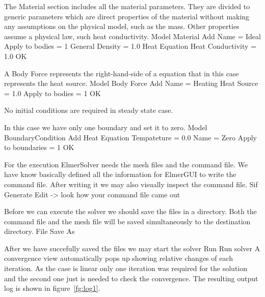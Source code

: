 The Material section includes all the material parameters.
They are divided to generic parameters which are direct properties of the material
without making any assumptions on the physical model, such as the mass. Other properties assume
a physical law, such heat conductivity.
\ttbegin
Model
  Material
    Add 
      Name = Ideal
      Apply to bodies = 1 
      General    
        Density = 1.0
      Heat Equation
        Heat Conductivity = 1.0
    OK
\ttend

A Body Force represents the right-hand-side of a equation that in this case represents
the heat source. 
\ttbegin
Model
  Body Force
    Add 
      Name = Heating
      Heat Source = 1.0
      Apply to bodies = 1
    OK
\ttend    

No initial conditions are required in steady state case.

In this case we have only one boundary and set it to zero.
\ttbegin
Model
  BoundaryCondition
    Add 
      Heat Equation
        Tempateture = 0.0
      Name = Zero
      Apply to boundaries = 1
    OK
\ttend   


For the execution 
ElmerSolver needs the mesh files and the command file. We have know basically defined
all the information for ElmerGUI to write the command file. After writing it we may also visually 
inspect the command file.
\ttbegin
Sif 
  Generate
  Edit -> look how your command file came out  
\ttend

Before we can execute the solver we should save the files in a directory. Both the command file and
the mesh file will be saved simultaneously to the destination directory.
\ttbegin
File 
  Save As
\ttend

After we have succefully saved the files we may start the solver
\ttbegin
Run
  Run solver
\ttend
A convergence view automatically pops up showing relative changes of each iteration.
As the case is linear only one iteration was required for the solution and the second one
just is needed to check the convergence. 
The resulting output log is shown in figure~\ref{fg:log1}.


